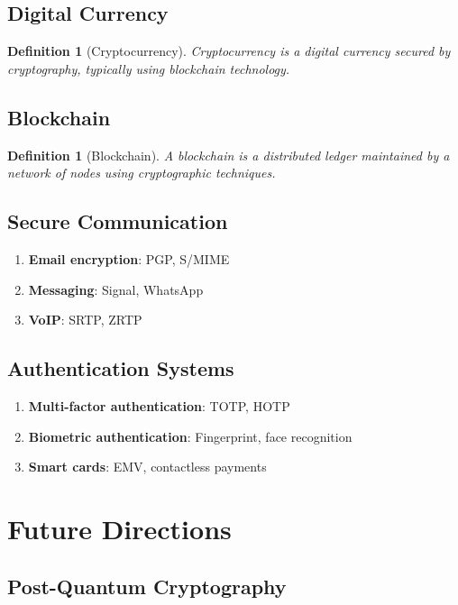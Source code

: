 \documentclass[11pt,a4paper]{article}
\newtheorem{definition}[theorem]{Definition}
\begin{document}
\subsection{Digital Currency}

\begin{definition}[Cryptocurrency]
Cryptocurrency is a digital currency secured by cryptography, typically using blockchain technology.
\end{definition}

\subsection{Blockchain}

\begin{definition}[Blockchain]
A blockchain is a distributed ledger maintained by a network of nodes using cryptographic techniques.
\end{definition}

\subsection{Secure Communication}

\begin{enumerate}
\item \textbf{Email encryption}: PGP, S/MIME
\item \textbf{Messaging}: Signal, WhatsApp
\item \textbf{VoIP}: SRTP, ZRTP
\end{enumerate}

\subsection{Authentication Systems}

\begin{enumerate}
\item \textbf{Multi-factor authentication}: TOTP, HOTP
\item \textbf{Biometric authentication}: Fingerprint, face recognition
\item \textbf{Smart cards}: EMV, contactless payments
\end{enumerate}

\section{Future Directions}

\subsection{Post-Quantum Cryptography}
\end{document}
